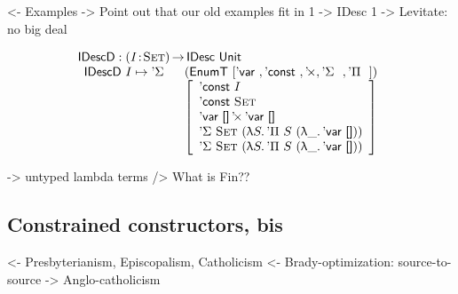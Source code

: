 \documentclass[preprint, authoryear, onecolumn]{sigplanconf}
\newenvironment{structure}{\footnotesize\verbatim}{\endverbatim}
\begin{document}
\begin{structure}
<- Examples
    -> Point out that our old examples fit in 1 -> IDesc 1
    -> Levitate: no big deal
\end{structure}

\[\stk{
\IDescD : \PI{\V{I}}{\Set} \IDesc{\Unit} \\
\begin{array}{ll}
\IDescD~I \mapsto \DSigma{}{} & (\EnumT [ \DVar{},
\DConst{},
                                                                                    \DProd{}{},
                                          \DSigma{}{}, 
                                          \DPi{}{} ]) \\
                              & \left[\begin{array}{l}
                                      \DConst{I}                  \\
                                      \DConst{\Set}               \\
                                      \DProd{\DVar{\Void}}{\DVar{\Void}}  \\
                                      \DSigma{\Set}{(\LAM{S} \DPi{S}{(\LAM{\_} \DVar{\Void})})} \\
                                      \DSigma{\Set}{(\LAM{S} \DPi{S}{(\LAM{\_} \DVar{\Void})})}
                                   \end{array}
                             \right]
\end{array}
}\]

\begin{structure}
    -> untyped lambda terms
        /> What is Fin??
\end{structure}

\subsection{Constrained constructors, bis}

\begin{structure}
<- Presbyterianism, Episcopalism, Catholicism
<- Brady-optimization: source-to-source
    -> Anglo-catholicism
\end{structure}


\end{document}
